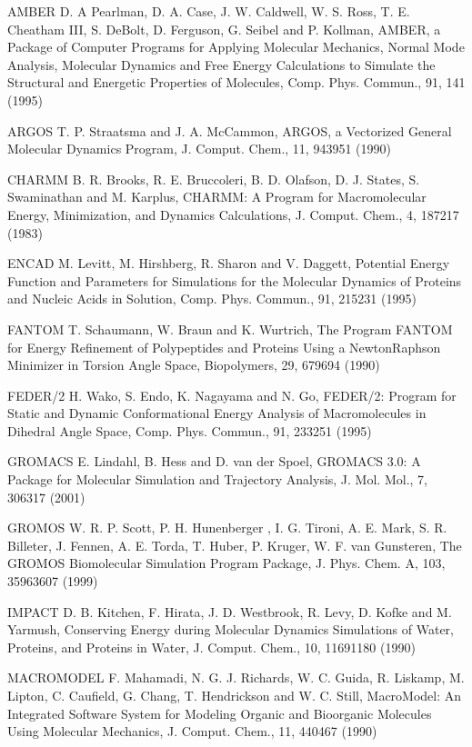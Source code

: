 \documentclass[letterpaper,11pt,english]{sphinxmanual}
\begin{document}
AMBER     D. A Pearlman, D. A. Case, J. W. Caldwell, W. S. Ross, T. E. Cheatham III, S. DeBolt, D. Ferguson, G. Seibel and P. Kollman, AMBER, a Package of Computer Programs for Applying Molecular Mechanics, Normal Mode Analysis, Molecular Dynamics and Free Energy Calculations to Simulate the Structural and Energetic Properties of Molecules, Comp. Phys. Commun., 91, 1\sphinxhyphen{}41 (1995)

ARGOS     T. P. Straatsma and J. A. McCammon, ARGOS, a Vectorized General Molecular Dynamics Program, J. Comput. Chem., 11, 943\sphinxhyphen{}951 (1990)

CHARMM     B. R. Brooks, R. E. Bruccoleri, B. D. Olafson, D. J. States, S. Swaminathan and M. Karplus, CHARMM: A Program for Macromolecular Energy, Minimization, and Dynamics Calculations, J. Comput. Chem., 4, 187\sphinxhyphen{}217 (1983)

ENCAD     M. Levitt, M. Hirshberg, R. Sharon and V. Daggett, Potential Energy Function and Parameters for Simulations for the Molecular Dynamics of Proteins and Nucleic Acids in Solution, Comp. Phys. Commun., 91, 215\sphinxhyphen{}231 (1995)

FANTOM     T. Schaumann, W. Braun and K. Wurtrich, The Program FANTOM for Energy Refinement of Polypeptides and Proteins Using a Newton\sphinxhyphen{}Raphson Minimizer in Torsion Angle Space, Biopolymers, 29, 679\sphinxhyphen{}694 (1990)

FEDER/2     H. Wako, S. Endo, K. Nagayama and N. Go, FEDER/2: Program for Static and Dynamic Conformational Energy Analysis of Macro\sphinxhyphen{}molecules in Dihedral Angle Space, Comp. Phys. Commun., 91, 233\sphinxhyphen{}251 (1995)

GROMACS     E. Lindahl, B. Hess and D. van der Spoel, GROMACS 3.0: A Package for Molecular Simulation and Trajectory Analysis, J. Mol. Mol., 7, 306\sphinxhyphen{}317 (2001)

GROMOS     W. R. P. Scott, P. H. Hunenberger , I. G. Tironi, A. E. Mark, S. R. Billeter, J. Fennen, A. E. Torda, T. Huber, P. Kruger, W. F. van Gunsteren, The GROMOS Biomolecular Simulation Program Package, J. Phys. Chem. A, 103, 3596\sphinxhyphen{}3607 (1999)

IMPACT     D. B. Kitchen, F. Hirata, J. D. Westbrook, R. Levy, D. Kofke and M. Yarmush, Conserving Energy during Molecular Dynamics Simulations of Water, Proteins, and Proteins in Water, J. Comput. Chem., 10, 1169\sphinxhyphen{}1180 (1990)

MACROMODEL     F. Mahamadi, N. G. J. Richards, W. C. Guida, R. Liskamp, M. Lipton, C. Caufield, G. Chang, T. Hendrickson and W. C. Still, MacroModel: An Integrated Software System for Modeling Organic and Bioorganic Molecules Using Molecular Mechanics, J. Comput. Chem., 11, 440\sphinxhyphen{}467 (1990)
\end{document}
